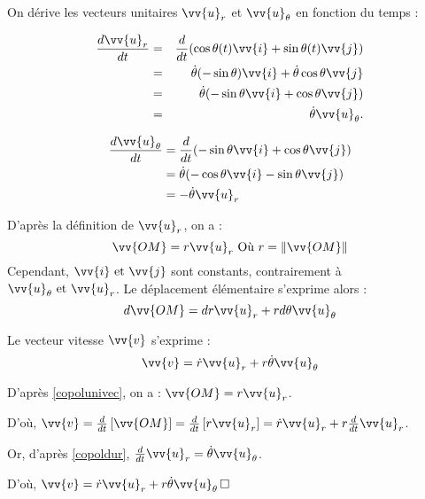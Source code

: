 \begin{corollary}
    On dérive les vecteurs unitaires \(\vv{u}_{r}\) et \(\vv{u}_{\theta }\) en fonction du temps : 
    \begin{corollary}[\(\vec{u}_{r}\)]\label{copoldur}
        \begin{eqnarray*}
            \frac{d\vv{u}_r}{dt} &=& \frac{d}{dt} (\cos\theta(t) \vv{i} + \sin\theta(t)\vv{j})\\
            &=& \dot{\theta} (-\sin\theta) \vv{i} + \dot{\theta} \cos\theta \vv{j}\\
            &=& \dot{\theta} (-\sin\theta \vv{i} + \cos\theta \vv{j})\\
            &=& \dot{\theta}\vv{u}_\theta
        .\end{eqnarray*}
    \end{corollary} 
    
    \begin{corollary}\label{copoldut}
        \begin{align*}
            \frac{d\vv{u}_\theta}{dt} &= \frac{d}{dt}(-\sin\theta\vv{i}+\cos\theta\vv{j}) \\
            &= \dot{\theta}(-\cos\theta \vv{i} - \sin\theta\vv{j}) \\
            &= -\dot{\theta}\vv{u}_r
        \end{align*}
    \end{corollary}
\end{corollary}

\begin{corollary}\label{copolunivec}
    D'après la définition de \(\vv{u}_{r}\), on a : 
    \[
        \vv{OM} = r\vv{u}_{r} \text{ Où } r = \lVert \vv{OM} \rVert 
    \] 
    Cependant, $\vv{i} \text{ et } \vv{j}$ sont constants, contrairement à $\vv{u}_\theta \text{ et } \vv{u}_r$. Le déplacement élémentaire s'exprime alors :
    \[
        d \vv{OM} = dr\vv{u}_{r} + rd \theta \vv{u}_{\theta }
    \]
\end{corollary}

\begin{corollary}\label{copolvvec}
    Le vecteur vitesse \(\vv{v}\) s'exprime : 
    \[
        \vv{v} = \dot{r}\vv{u}_{r} + r \dot{\theta }\vv{u}_{\theta}
    \] 
    \begin{explanation}
        D'après \autoref{copolunivec}, on a : \(\vv{OM} = r\vv{u}_{r}\).\par
        D'où, \(\vv{v} = \frac{d}{dt}\left[ \vv{OM} \right] = \frac{d}{dt}\left[ r\vv{u}_{r} \right] = \dot{r}\vv{u}_{r} + r\frac{d}{dt}\vv{u}_{r}\).\par
        Or, d'après \autoref{copoldur}, \(\frac{d}{dt}\vv{u}_{r} = \dot{\theta}\vv{u}_{\theta}\).\par
        D'où, \(\vv{v} = \dot{r}\vv{u}_{r} + r \dot{\theta }\vv{u}_{\theta} \,\square\) 
    \end{explanation}
\end{corollary}

